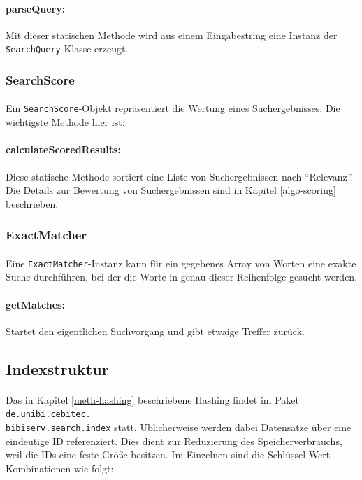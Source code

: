 \paragraph{parseQuery:} Mit dieser statischen Methode wird aus einem Eingabestring eine Instanz der \texttt{SearchQuery}-Klasse erzeugt.

\subsubsection{SearchScore}

\paragraph{} Ein \texttt{SearchScore}-Objekt repräsentiert die Wertung eines Suchergebnisses. Die wichtigste Methode hier ist:

\paragraph{calculateScoredResults:} Diese statische Methode sortiert eine Liste von Suchergebnissen nach "`Relevanz"'. Die Details zur Bewertung von Suchergebnissen sind in Kapitel \ref{algo-scoring} beschrieben.

\subsubsection{ExactMatcher}

\paragraph{} Eine \texttt{ExactMatcher}-Instanz kann für ein gegebenes Array von Worten eine exakte Suche durchführen, bei der die Worte in genau dieser Reihenfolge gesucht werden.

\paragraph{getMatches:} Startet den eigentlichen Suchvorgang und gibt etwaige Treffer zurück.

\subsection{Indexstruktur}
\label{arch-index}

\paragraph{} Das in Kapitel \ref{meth-hashing} beschriebene Hashing findet im Paket \texttt{de.unibi.cebitec.\\bibiserv.search.index} statt. Üblicherweise werden dabei Datensätze über eine eindeutige ID referenziert. Dies dient zur Reduzierung des Speicherverbrauchs, weil die IDs eine feste Größe besitzen. Im Einzelnen sind die Schlüssel-Wert-Kombinationen wie folgt:

